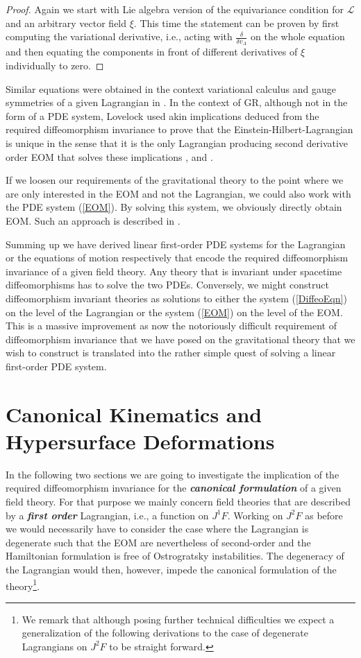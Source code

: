 \documentclass[a4paper,12pt, DIV=14, BCOR=5mm, twoside, headsepline, numbers=noenddot]{scrbook}
\begin{document}
\begin{proof}
Again we start with Lie algebra version of the equivariance condition for $\mathcal{L}$ and an arbitrary vector field $\xi$. This time the statement can be proven by first computing the variational derivative, i.e., acting with $\frac{\delta}{\delta v_A}$ on the whole equation and then equating the components in front of different derivatives of $\xi$ individually to zero. 
\end{proof}
Similar equations were obtained in the context variational calculus and gauge symmetries of a given Lagrangian in \cite{article}. In the context of GR, although not in the form of a PDE system, Lovelock used akin implications deduced from the required diffeomorphism invariance to prove that the Einstein-Hilbert-Lagrangian is unique in the sense that it is the only Lagrangian producing second derivative order EOM that solves these implications \cite{Lovelock1969}, \cite{doi:10.1063/1.1666069} and \cite{doi:10.1063/1.1665613}. 

If we loosen our requirements of the gravitational theory to the point where we are only interested in the EOM and not the Lagrangian, we could also work with the PDE system (\ref{EOM}). By solving this system, we obviously directly obtain EOM. Such an approach is described in \cite{TobiR}.

Summing up we have derived linear first-order PDE systems for the Lagrangian or the equations of motion respectively that encode the required diffeomorphism invariance of a given field theory. Any theory that is invariant under spacetime diffeomorphisms has to solve the two PDEs. Conversely, we might construct diffeomorphism invariant theories as solutions to either the system (\ref{DiffeoEqn}) on the level of the Lagrangian or the system (\ref{EOM}) on the level of the EOM. This is a massive improvement as now the notoriously difficult requirement of diffeomorphism invariance that we have posed on the gravitational theory that we wish to construct is translated into the rather simple quest of solving a linear first-order PDE system.  



\section{Canonical Kinematics and Hypersurface Deformations}
In the following two sections we are going to investigate the implication of the required diffeomorphism invariance for the \textit{\textbf{canonical formulation}} of a given field theory. For that purpose we mainly concern field theories that are described by a \textit{\textbf{first order}} Lagrangian, i.e., a function on $J^1F$. Working on $J^2F$ as before we would necessarily have to consider the case where the Lagrangian is degenerate such that the EOM are nevertheless of second-order and the Hamiltonian formulation is free of Ostrogratsky instabilities. The degeneracy of the Lagrangian would then, however, impede the canonical formulation of the theory\footnote{We remark that although posing further technical difficulties we expect a generalization of the following derivations to the case of degenerate Lagrangians on $J^2F$ to be straight forward.}.
\end{document}
